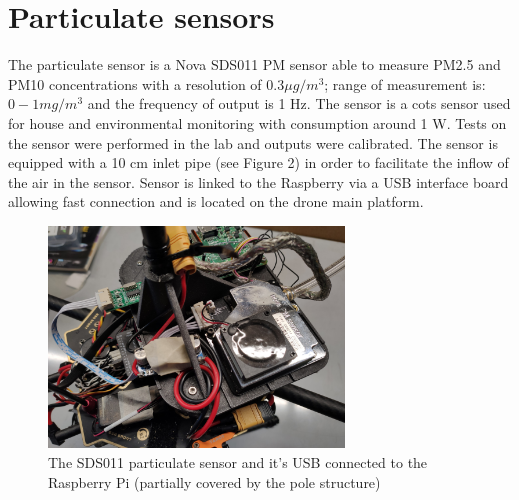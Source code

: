\section{Particulate sensors}
The particulate sensor is a Nova SDS011 PM sensor able to measure PM2.5 and PM10
concentrations with a resolution of $0.3\mu g/m^3$; range of measurement is: $0 - 1 mg/m^3$ and the frequency
of output is 1 Hz. The sensor is a \gls{cots} sensor used for house and environmental monitoring with
consumption around 1 W. Tests on the sensor were performed in the lab and outputs were calibrated.
The sensor is equipped with a 10 cm inlet pipe (see Figure 2) in order to facilitate the inflow of the air
in the sensor. Sensor is linked to the Raspberry via a USB interface board allowing fast connection and
is located on the drone main platform.
\begin{figure}[h!]
    \centering
    \includegraphics[width=0.7\textwidth]{images/drone/IMG_20211105_104126.jpg}
    \caption{The SDS011 particulate sensor and it's USB connected to the Raspberry Pi (partially covered by the pole structure)}
    \label{fig:sds011}
\end{figure}
\clearpage
